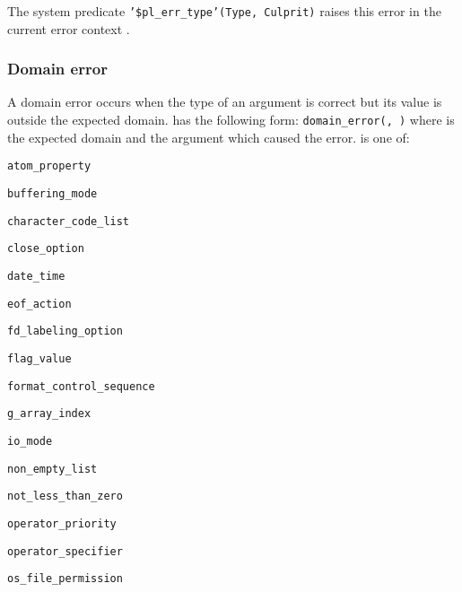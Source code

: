 The system predicate \texttt{'\$pl\_err\_type'(Type, Culprit)} raises this
error in the current error context .

\subsubsection{Domain error}
\label{Domain-error}
A domain error occurs when the type of an argument is correct but its value
is outside the expected domain.  has the
following form: \texttt{domain\_error(, )}
where  is the expected domain and
 the argument which caused the error.
 is one of:

\begin{ItemizeThreeCols}

\item \texttt{atom\_property}

\item \texttt{buffering\_mode}

\item \texttt{character\_code\_list}

\item \texttt{close\_option}

\item \texttt{date\_time}

\item \texttt{eof\_action}

\item \texttt{fd\_labeling\_option}

\item \texttt{flag\_value}

\item \texttt{format\_control\_sequence}

\item \texttt{g\_array\_index}

\item \texttt{io\_mode}

\item \texttt{non\_empty\_list}

\item \texttt{not\_less\_than\_zero}

\item \texttt{operator\_priority}

\item \texttt{operator\_specifier}

\item \texttt{os\_file\_permission}


\end{ItemizeThreeCols}
